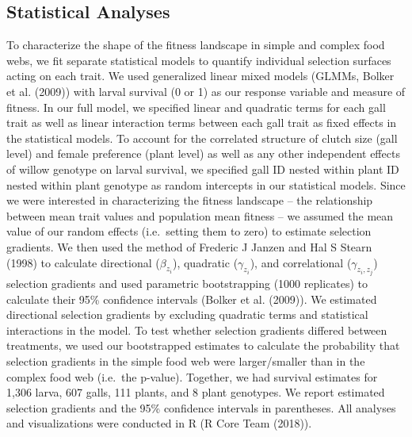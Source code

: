 \documentclass[]{elsarticle} %
\begin{document}
\subsection{Statistical Analyses}\label{statistical-analyses}

To characterize the shape of the fitness landscape in simple and complex
food webs, we fit separate statistical models to quantify individual
selection surfaces acting on each trait. We used generalized linear
mixed models (GLMMs, Bolker et al. (2009)) with larval survival (0 or 1)
as our response variable and measure of fitness. In our full model, we
specified linear and quadratic terms for each gall trait as well as
linear interaction terms between each gall trait as fixed effects in the
statistical models. To account for the correlated structure of clutch
size (gall level) and female preference (plant level) as well as any
other independent effects of willow genotype on larval survival, we
specified gall ID nested within plant ID nested within plant genotype as
random intercepts in our statistical models. Since we were interested in
characterizing the fitness landscape -- the relationship between mean
trait values and population mean fitness -- we assumed the mean value of
our random effects (i.e.~setting them to zero) to estimate selection
gradients. We then used the method of Frederic J Janzen and Hal S Stearn
(1998) to calculate directional (\(\beta_{z_i}\)), quadratic
(\(\gamma_{z_i}\)), and correlational (\(\gamma_{z_i,z_j}\)) selection
gradients and used parametric bootstrapping (1000 replicates) to
calculate their 95\% confidence intervals (Bolker et al. (2009)). We
estimated directional selection gradients by excluding quadratic terms
and statistical interactions in the model. To test whether selection
gradients differed between treatments, we used our bootstrapped
estimates to calculate the probability that selection gradients in the
simple food web were larger/smaller than in the complex food web
(i.e.~the p-value). Together, we had survival estimates for 1,306 larva,
607 galls, 111 plants, and 8 plant genotypes. We report estimated
selection gradients and the 95\% confidence intervals in parentheses.
All analyses and visualizations were conducted in R (R Core Team
(2018)).
\end{document}
